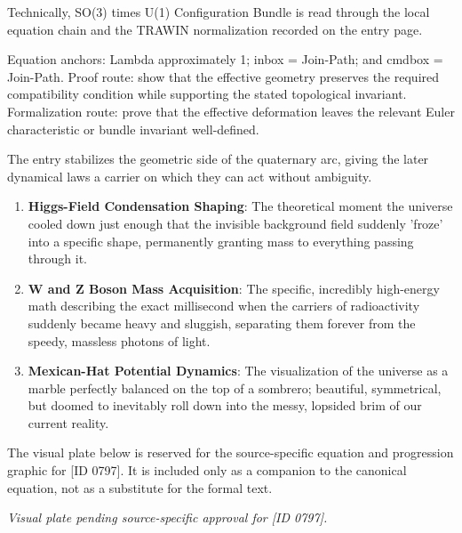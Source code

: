 Technically, SO(3) times U(1) Configuration Bundle is read through the local equation chain and the TRAWIN normalization recorded on the entry page.

Equation anchors: Lambda approximately 1; inbox = Join-Path; and cmdbox = Join-Path. Proof route: show that the effective geometry preserves the required compatibility condition while supporting the stated topological invariant. Formalization route: prove that the effective deformation leaves the relevant Euler characteristic or bundle invariant well-defined.

The entry stabilizes the geometric side of the quaternary arc, giving the later dynamical laws a carrier on which they can act without ambiguity.
\endgroup

\begin{enumerate}[leftmargin=1.6em,itemsep=6pt,topsep=4pt]
\item \textbf{Higgs-Field Condensation Shaping}: The theoretical moment the universe cooled down just enough that the invisible background field suddenly 'froze' into a specific shape, permanently granting mass to everything passing through it.
\item \textbf{W and Z Boson Mass Acquisition}: The specific, incredibly high-energy math describing the exact millisecond when the carriers of radioactivity suddenly became heavy and sluggish, separating them forever from the speedy, massless photons of light.
\item \textbf{Mexican-Hat Potential Dynamics}: The visualization of the universe as a marble perfectly balanced on the top of a sombrero; beautiful, symmetrical, but doomed to inevitably roll down into the messy, lopsided brim of our current reality.
\end{enumerate}

\begingroup\footnotesize\sloppy
The visual plate below is reserved for the source-specific equation and progression graphic for [ID 0797]. It is included only as a companion to the canonical equation, not as a substitute for the formal text.
\par\endgroup
\begingroup\footnotesize\itshape
Visual plate pending source-specific approval for [ID 0797].
\par\endgroup

